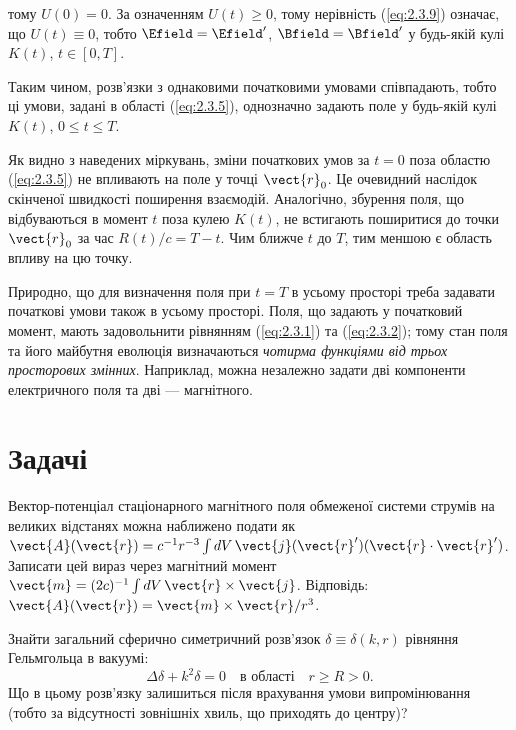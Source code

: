 тому \( U(0) = 0 \). За означенням \( U(t) \geq 0 \), тому нерівність (\ref{eq:2.3.9}) означає, що \( U(t) \equiv 0 \), тобто \( \Efield = \Efield'
\), \( \Bfield = \Bfield' \) у будь-якій кулі \( K(t) \), \( t \in [0, T] \).

Таким чином, розв’язки з однаковими початковими умовами співпадають, тобто ці умови, задані в області (\ref{eq:2.3.5}), однозначно задають поле у
будь-якій кулі \( K(t) \), \( 0 \leq t \leq T \).

Як видно з наведених міркувань, зміни початкових умов за \( t = 0 \) поза областю (\ref{eq:2.3.5}) не впливають на поле у точці \( \vect{r}_0 \). Це
очевидний наслідок скінченої швидкості поширення взаємодій. Аналогічно, збурення поля, що відбуваються в момент \( t \) поза кулею \( K(t) \), не
встигають поширитися до точки \( \vect{r}_0 \) за час \( R(t)/c = T - t \). Чим ближче \( t \) до \( T \), тим меншою є область впливу на цю точку.

Природно, що для визначення поля при \( t = T \) в усьому просторі треба задавати початкові умови також в усьому просторі. Поля, що задають у початковий
момент, мають задовольнити рівнянням (\ref{eq:2.3.1}) та (\ref{eq:2.3.2}); тому стан поля та його майбутня еволюція визначаються \emph{чотирма функціями
від трьох просторових змінних}. Наприклад, можна незалежно задати дві компоненти електричного поля та дві --- магнітного.

\section*{Задачі}

\begin{problem}%
Вектор-потенціал стаціонарного магнітного поля обмеженої системи струмів на великих відстанях можна наближено подати як \( \vect{A}(\vect{r}) =
c^{-1} r^{-3} \int dV \, \vect{j}(\vect{r}')(\vect{r} \cdot \vect{r}') \). Записати цей вираз через магнітний момент \( \vect{m} = (2c)^{-1} \int dV \,
\vect{r} \times \vect{j} \). Відповідь: \( \vect{A}(\vect{r}) = \vect{m} \times \vect{r} / r^3 \).
\end{problem}


\begin{problem}%
Знайти загальний сферично симетричний розв’язок \( \delta \equiv \delta(k, r) \) рівняння Гельмгольца в вакуумі:
\[
\Delta \delta + k^2 \delta = 0 \quad \text{в області} \quad r \geq R > 0.
\]
Що в цьому розв’язку залишиться після врахування умови випромінювання (тобто за відсутності зовнішніх хвиль, що приходять до центру)?
\end{problem}

